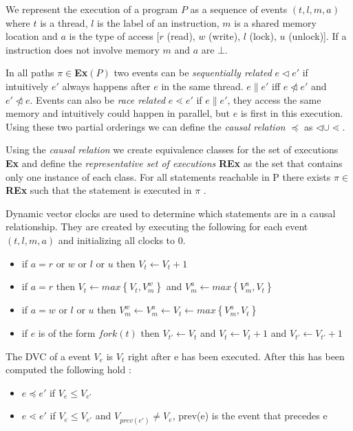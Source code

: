 \documentclass[10pt]{llncs}
\begin{document}
We represent the execution of a program $P$ as a sequence of events $(t, l, m, a)$ where $t$ is a thread, $l$ is the label of an instruction, $m$ is a shared memory location and $a$ is the type of access [$r$ (read), $w$ (write), $l$ (lock), $u$ (unlock)]. If a instruction does not involve memory $m$ and $a$ are $\bot$.

In all paths $\pi \in $\textbf{Ex}$(P)$ two events can be \emph{sequentially related} $e \triangleleft e'$ if intuitively $e'$ always happens after $e$ in the same thread. $e \parallel e'$ iff $e \ntriangleleft e'$ and $e' \ntriangleleft e$. Events can also be \emph{race related} $e \lessdot e'$ if $e \parallel e'$, they access the same memory and intuitively could happen in parallel, but $e$ is first in this execution. Using these two partial orderings we can define the \emph{causal relation} $\preceq$ as $\triangleleft \cup \lessdot$.

Using the \emph{causal relation} we create equivalence classes for the set of executions \textbf{Ex} and define the \emph{representative set of executions} \textbf{REx} as the set that contains only one instance of each class. For all statements reachable in P there exists $\pi \in$ \textbf{REx} such that the statement is executed in $\pi$ \cite[§4]{base4}.

Dynamic vector clocks are used to determine which statements are in a causal relationship. They are created by executing the following for each event $(t, l, m, a)$ and initializing all clocks to $0$.

\begin{itemize}
	\item if $a = r$ or $w$ or $l$ or $u$ then $V_t \leftarrow V_t + 1$
	\item if $a = r$ then $V_t \leftarrow max \left\lbrace V_t, V_m^w \right\rbrace$ and $V_m^a \leftarrow max \left\lbrace V_m^a, V_t \right\rbrace$
	\item  if $a = w$ or $l$ or $u$ then $V_m^w \leftarrow V_m^a \leftarrow V_t \leftarrow max \left\lbrace V_m^a, V_t \right\rbrace$
	\item if $e$ is of the form $fork(t)$ then $V_{t'} \leftarrow V_t$ and $V_t \leftarrow V_t + 1$ and $V_{t'} \leftarrow V_{t'} + 1$
\end{itemize}

The DVC of a event $V_e$ is $V_t$ right after e has been executed. After this has been computed the following hold \cite[§4]{base4}:

\begin{itemize}
	\item $e \preceq e'$ if $V_e \leq V_{e'}$
	\item $e \lessdot e'$ if $V_e \leq V_{e'}$ and $V_{prev(e')} \neq V_e$, prev(e) is the event that precedes e
\end{itemize}
\end{document}
